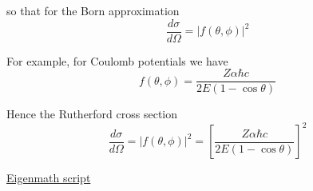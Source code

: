 so that for the Born approximation
\begin{equation*}
\frac{d\sigma}{d\Omega}=|f(\theta,\phi)|^2
\end{equation*}

For example, for Coulomb potentials we have
\begin{equation*}
f(\theta,\phi)=\frac{Z\alpha\hbar c}{2E(1-\cos\theta)}
\end{equation*}

Hence the Rutherford cross section
\begin{equation*}
\frac{d\sigma}{d\Omega}
=|f(\theta,\phi)|^2
=\left[\frac{Z\alpha\hbar c}{2E(1-\cos\theta)}\right]^2
\end{equation*}

\href{https://georgeweigt.github.io/examples/born-approximation-1-demo.html}{Eigenmath script}



